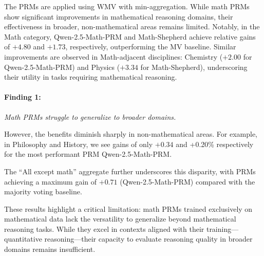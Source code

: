 The PRMs are applied using WMV with min-aggregation. While math PRMs show significant improvements in mathematical reasoning domains,
their effectiveness in broader, non-mathematical areas remains limited.
Notably, in the Math category,
Qwen-2.5-Math-PRM and Math-Shepherd achieve relative gains of $+4.80$ and $+1.73$,
respectively,
outperforming the MV baseline.
Similar improvements are observed in Math-adjacent disciplines:
Chemistry ($+2.00$ for Qwen-2.5-Math-PRM) and Physics ($+3.34$ for Math-Shepherd),
underscoring their utility in tasks requiring mathematical reasoning.

\begin{highlight}
    \paragraph{Finding 1:} 
    \emph{Math PRMs struggle to generalize to broader domains.}
\end{highlight}

However, the benefits diminish sharply in non-mathematical areas.
For example, in Philosophy and History, we see gains of only $+0.34$ and +0.20\% respectively for the most performant PRM Qwen-2.5-Math-PRM.

The ``All except math'' aggregate further underscores this disparity, with PRMs achieving a maximum gain of $+0.71$ (Qwen-2.5-Math-PRM) compared with the majority voting baseline.

These results highlight a critical limitation: math PRMs trained exclusively on mathematical data lack the versatility to generalize beyond mathematical reasoning tasks. While they excel in contexts aligned with their training---quantitative reasoning---their capacity to evaluate reasoning quality in broader domains remains insufficient.
